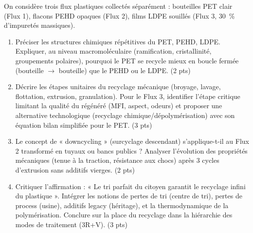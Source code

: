 \documentclass[11pt]{article}
\begin{document}
\begin{exercice}
On considère trois flux plastiques collectés séparément : bouteilles PET clair (Flux 1), flacons PEHD opaques (Flux 2), films LDPE souillés (Flux 3, \SI{30}{\%} d'impuretés massiques).
\begin{enumerate}
    \item Préciser les structures chimiques répétitives du PET, PEHD, LDPE. Expliquer, au niveau macromoléculaire (ramification, cristallinité, groupements polaires), pourquoi le PET se recycle mieux en boucle fermée (bouteille $\to$ bouteille) que le PEHD ou le LDPE. (2 pts)
    \item Décrire les étapes unitaires du recyclage mécanique (broyage, lavage, flottation, extrusion, granulation). Pour le Flux 3, identifier l'étape critique limitant la qualité du régénéré (MFI, aspect, odeurs) et proposer une alternative technologique (recyclage chimique/dépolymérisation) avec son équation bilan simplifiée pour le PET. (3 pts)
    \item Le concept de « downcycling » (surcyclage descendant) s'applique-t-il au Flux 2 transformé en tuyaux ou bancs publics ? Analyser l'évolution des propriétés mécaniques (tenue à la traction, résistance aux chocs) après 3 cycles d'extrusion sans additifs vierges. (2 pts)
    \item Critiquer l'affirmation : « Le tri parfait du citoyen garantit le recyclage infini du plastique ». Intégrer les notions de pertes de tri (centre de tri), pertes de process (usine), additifs legacy (héritage), et la thermodynamique de la polymérisation. Conclure sur la place du recyclage dans la hiérarchie des modes de traitement (3R+V). (3 pts)
\end{enumerate}
\end{exercice}
\end{document}
